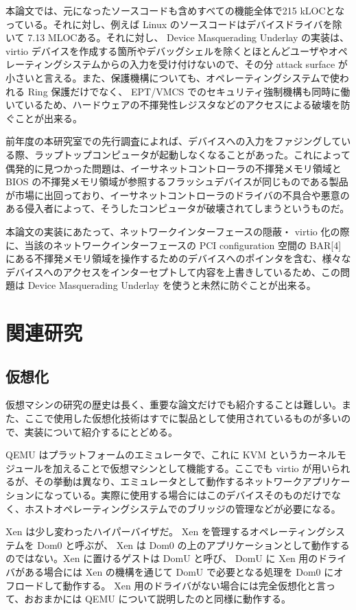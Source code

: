 \documentclass[a4paper,11pt,report]{ltjsbook}
\begin{document}
本論文では、元になったソースコードも含めすべての機能全体で215 kLOCとなっている。それに対し、例えば Linux のソースコードはデバイスドライバを除いて 7.13 MLOCある。それに対し、 Device Masquerading Underlay の実装は、 virtio デバイスを作成する箇所やデバッグシェルを除くとほとんどユーザやオペレーティングシステムからの入力を受け付けないので、その分 attack surface が小さいと言える。また、保護機構についても、オペレーティングシステムで使われる Ring 保護だけでなく、 EPT/VMCS でのセキュリティ強制機構も同時に働いているため、ハードウェアの不揮発性レジスタなどのアクセスによる破壊を防ぐことが出来る。

前年度の本研究室での先行調査によれば、デバイスへの入力をファジングしている際、ラップトップコンピュータが起動しなくなることがあった。これによって偶発的に見つかった問題は、イーサネットコントローラの不揮発メモリ領域と BIOS の不揮発メモリ領域が参照するフラッシュデバイスが同じものである製品が市場に出回っており、イーサネットコントローラのドライバの不具合や悪意のある侵入者によって、そうしたコンピュータが破壊されてしまうというものだ。

本論文の実装にあたって、ネットワークインターフェースの隠蔽・ virtio 化の際に、当該のネットワークインターフェースの PCI configuration 空間の BAR[4] にある不揮発メモリ領域を操作するためのデバイスへのポインタを含む、様々なデバイスへのアクセスをインターセプトして内容を上書きしているため、この問題は Device Masquerading Underlay を使うと未然に防ぐことが出来る。

\chapter{関連研究}

\section{仮想化}

仮想マシンの研究の歴史は長く、重要な論文だけでも紹介することは難しい。また、ここで使用した仮想化技術はすでに製品として使用されているものが多いので、実装について紹介するにとどめる。

QEMU はプラットフォームのエミュレータで、これに KVM というカーネルモジュールを加えることで仮想マシンとして機能する。ここでも virtio が用いられるが、その挙動は異なり、エミュレータとして動作するネットワークアプリケーションになっている。実際に使用する場合にはこのデバイスそのものだけでなく、ホストオペレーティングシステムでのブリッジの管理などが必要になる。

Xen は少し変わったハイパーバイザだ。 Xen を管理するオペレーティングシステムを Dom0 と呼ぶが、 Xen は Dom0 の上のアプリケーションとして動作するのではない。Xen に置けるゲストは DomU と呼び、 DomU に Xen 用のドライバがある場合には Xen の機構を通じて DomU で必要となる処理を Dom0 にオフロードして動作する。 Xen 用のドライバがない場合には完全仮想化と言って、おおまかには QEMU について説明したのと同様に動作する。
\end{document}
